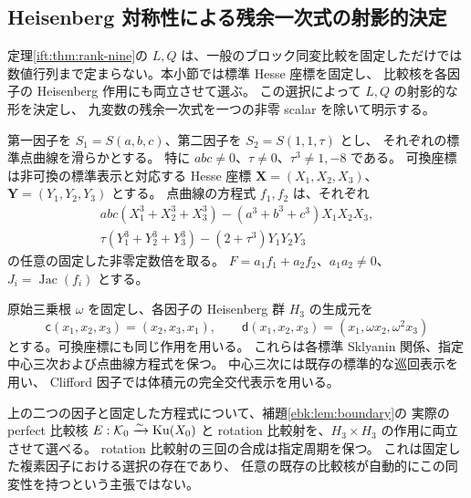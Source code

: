 \subsection{Heisenberg 対称性による残余一次式の射影的決定}
\label{ife:subsec:equivariant-ks}

定理\ref{ift:thm:rank-nine}の $L,Q$ は、一般のブロック同変比較を固定しただけでは
数値行列まで定まらない。本小節では標準 Hesse 座標を固定し、
比較核を各因子の Heisenberg 作用にも両立させて選ぶ。
この選択によって $L,Q$ の射影的な形を決定し、
九変数の残余一次式を一つの非零 scalar を除いて明示する。

第一因子を $S_1=S(a,b,c)$、第二因子を $S_2=S(1,1,\tau)$ とし、
それぞれの標準点曲線を滑らかとする。
特に $abc\ne0$、$\tau\ne0$、$\tau^3\ne1,-8$ である。
可換座標は非可換の標準表示と対応する Hesse 座標
$\mathbf X=(X_1,X_2,X_3)$、$\mathbf Y=(Y_1,Y_2,Y_3)$ とする。
点曲線の方程式 $f_1,f_2$ は、それぞれ
\begin{equation}\label{ife:eq:hesse-equations}
 \begin{split}
  abc(X_1^3+X_2^3+X_3^3)-(a^3+b^3+c^3)X_1X_2X_3,\\
  \tau(Y_1^3+Y_2^3+Y_3^3)-(2+\tau^3)Y_1Y_2Y_3
 \end{split}
\end{equation}
の任意の固定した非零定数倍を取る。
$F=a_1f_1+a_2f_2$、$a_1a_2\ne0$、$J_i=\operatorname{Jac}(f_i)$ とする。

原始三乗根 $\omega$ を固定し、各因子の Heisenberg 群 $H_3$ の生成元を
\begin{equation}\label{ife:eq:heisenberg-generators}
 \mathsf c(x_1,x_2,x_3)=(x_2,x_3,x_1),\qquad
 \mathsf d(x_1,x_2,x_3)=(x_1,\omega x_2,\omega^2x_3)
\end{equation}
とする。可換座標にも同じ作用を用いる。
これらは各標準 Sklyanin 関係、指定中心三次および点曲線方程式を保つ。
中心三次には既存の標準的な巡回表示を用い、
Clifford 因子では体積元の完全交代表示を用いる。

\begin{lemma}
\label{ife:lem:equivariant-kernel}
上の二つの因子と固定した方程式について、補題\ref{ebk:lem:boundary}の
実際の perfect 比較核 $E:\mathcal K_0\xrightarrow{\sim}\operatorname{Ku}(X_0)$ と
rotation 比較射を、$H_3\times H_3$ の作用に両立させて選べる。
rotation 比較射の三回の合成は指定周期を保つ。
これは固定した複素因子における選択の存在であり、
任意の既存の比較核が自動的にこの同変性を持つという主張ではない。
\end{lemma}

